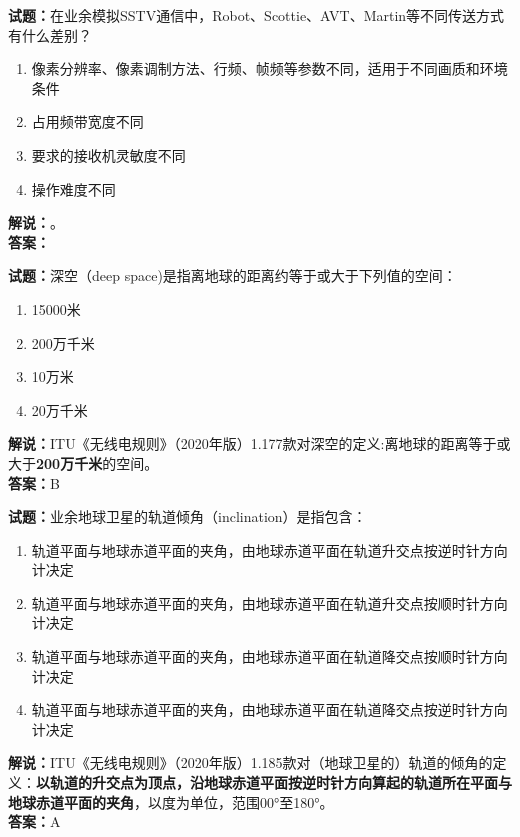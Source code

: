 \documentclass{ctexbook}
\begin{document}
\noindent\textbf{试题：}在业余模拟SSTV通信中，Robot、Scottie、AVT、Martin等不同传送方式有什么差别？
\begin{enumerate}[leftmargin=3em]
\item 像素分辨率、像素调制方法、行频、帧频等参数不同，适用于不同画质和环境条件
\item 占用频带宽度不同
\item 要求的接收机灵敏度不同
\item 操作难度不同
\end{enumerate}
\noindent\textbf{解说：}\textbf{}。\\\noindent\textbf{答案：}

\bigskip




\noindent\textbf{试题：}深空（deep space)是指离地球的距离约等于或大于下列值的空间：
\begin{enumerate}[leftmargin=3em]
\item 15000米
\item 200万千米
\item 10万米
\item 20万千米
\end{enumerate}
\noindent\textbf{解说：}ITU《无线电规则》（2020年版）1.177款对深空的定义:离地球的距离等于或大于\textbf{200万千米}的空间。\\\noindent\textbf{答案：}B

\bigskip




\noindent\textbf{试题：}业余地球卫星的轨道倾角（inclination）是指包含：
\begin{enumerate}[leftmargin=3em]
\item 轨道平面与地球赤道平面的夹角，由地球赤道平面在轨道升交点按逆时针方向计决定
\item 轨道平面与地球赤道平面的夹角，由地球赤道平面在轨道升交点按顺时针方向计决定
\item 轨道平面与地球赤道平面的夹角，由地球赤道平面在轨道降交点按顺时针方向计决定
\item 轨道平面与地球赤道平面的夹角，由地球赤道平面在轨道降交点按逆时针方向计决定
\end{enumerate}
\noindent\textbf{解说：}ITU《无线电规则》（2020年版）1.185款对（地球卫星的）轨道的倾角的定义：\textbf{以轨道的升交点为顶点，沿地球赤道平面按逆时针方向算起的轨道所在平面与地球赤道平面的夹角}，以度为单位，范围\ang{00;;}至\ang{180;;}。\\\noindent\textbf{答案：}A


\bigskip
\end{document}
